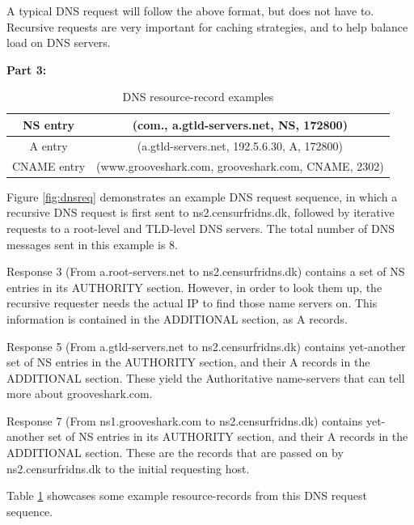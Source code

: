 A typical DNS request will follow the above format, but does not have to. Recursive requests are very important for caching strategies, and
to help balance load on DNS servers.

\noindent \textbf{Part 3:}\\
\begin{table}
\begin{tabular*}{1\textwidth}{| c | c |}
	\hline
	NS entry & (com., a.gtld-servers.net, NS, 172800)\\
	\hline
	A entry & (a.gtld-servers.net, 192.5.6.30, A, 172800)\\
	\hline
	CNAME entry & (www.grooveshark.com, grooveshark.com, CNAME, 2302)\\
	\hline
\end{tabular*}
\caption{DNS resource-record examples}
\label{tbl:rrexamples}
\end{table}

Figure \ref{fig:dnsreq} demonstrates an example DNS request sequence, in which a recursive DNS request is first sent to ns2.censurfridns.dk,
followed by iterative requests to a root-level and TLD-level DNS servers. The total number of DNS messages sent in this example is 8.

Response 3 (From a.root-servers.net to ns2.censurfridns.dk) contains a set of NS entries in its AUTHORITY section. However, in order to look them
up, the recursive requester needs the actual IP to find those name servers on. This information is contained in the ADDITIONAL section, as A
records. 

Response 5 (From a.gtld-servers.net to ns2.censurfridns.dk) contains yet-another set of NS entries in the AUTHORITY section, and their A records
in the ADDITIONAL section. These yield the Authoritative name-servers that can tell more about grooveshark.com.

Response 7 (From ns1.grooveshark.com to ns2.censurfridns.dk) contains yet-another set of NS entries in its AUTHORITY section, and their A records
in the ADDITIONAL section. These are the records that are passed on by ns2.censurfridns.dk to the initial requesting host.

Table \ref{tbl:rrexamples} showcases some example resource-records from this DNS request sequence.

